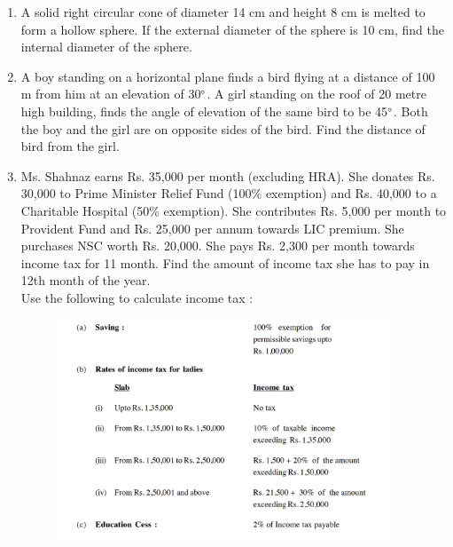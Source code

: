 \documentclass[journal,12pt,twocolumn]{IEEEtran}
\begin{document}
\begin{enumerate}
\medskip
\item A solid right circular cone of diameter 14 cm and height 8 cm is melted to form a hollow sphere. If the external diameter of the sphere is 10 cm, find the internal diameter of the sphere.
\medskip
\item A boy standing on a horizontal plane finds a bird flying at a distance of 100 m from him at an elevation of 30$\degree$. A girl standing on the roof of 20 metre high building, finds the angle of elevation of the same bird to be 45$\degree$. Both the boy and the girl are on opposite sides of the bird. Find the distance of bird from the girl.
\medskip
\item Ms. Shahnaz earns Rs. 35,000 per month (excluding HRA). She donates Rs. 30,000 to Prime Minister Relief Fund (100\% exemption) and Rs. 40,000 to a Charitable Hospital (50\% exemption). She contributes Rs. 5,000 per month to Provident Fund and Rs. 25,000 per annum towards LIC premium. She purchases NSC worth Rs. 20,000. She pays Rs. 2,300 per month towards income tax for 11 month. Find the amount of income tax she has to pay in 12th month of the year.\\
Use the following to calculate income tax :\\
\begin{figure}[h!]
    \centering
    \includegraphics[width=10cm]{10.png}
 \end{figure}
 \end{enumerate}
\end{document}
